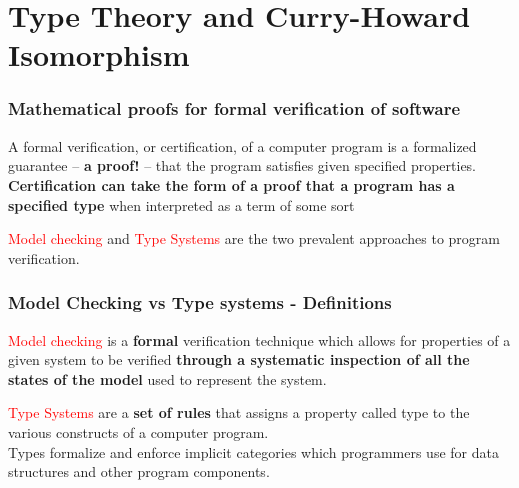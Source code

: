 \section{Type Theory and Curry-Howard Isomorphism}


\begin{frame}
\frametitle{Mathematical proofs for formal verification of software}
A formal verification, or certification, of a computer program is a formalized guarantee – \textbf{a proof!} – that the program satisfies given specified properties.
\\ \medskip
\textbf{Certification can take the form of a proof that a program has a specified type} when interpreted as a term of some sort\\
\end{frame}


\begin{frame}
\textcolor{red}{Model checking} and \textcolor{red}{Type Systems} are the two prevalent approaches to program verification. 
\end{frame}



\begin{frame}
\frametitle{Model Checking vs Type systems - Definitions}
\begin{definition}
 \textcolor{red}{Model checking} is a \textbf{formal} verification technique which allows for properties of a given system to be verified \textbf{through a systematic inspection of all the states of the model} used to represent the system.	
\end{definition}
\pause
\begin{definition}
	\textcolor{red}{Type Systems} are a \textbf{set of rules} that assigns a property called type to the various constructs of a computer program.\\
	Types formalize and enforce implicit categories which programmers use for data structures and other program components.
\end{definition}
\end{frame}


